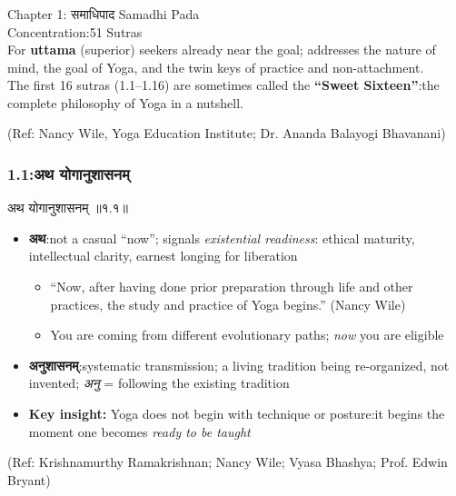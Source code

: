 \begin{frame}[fragile]\frametitle{}
\begin{center}
{\Large Chapter 1: समाधिपाद Samadhi Pada}\\
{\normalsize Concentration:51 Sutras}\\
{\small For \textbf{uttama} (superior) seekers already near the goal; addresses the nature of mind, the goal of Yoga, and the twin keys of practice and non-attachment.}\\
{\small The first 16 sutras (1.1–1.16) are sometimes called the \textbf{``Sweet Sixteen''}:the complete philosophy of Yoga in a nutshell.}
\end{center}
\tiny{(Ref: Nancy Wile, Yoga Education Institute; Dr. Ananda Balayogi Bhavanani)}
\end{frame}

\begin{frame}[fragile]\frametitle{1.1:अथ योगानुशासनम्}

\begin{sanskrit}
अथ योगानुशासनम् ॥१.१॥
\end{sanskrit}

\begin{itemize}
\item \textbf{अथ}:not a casual ``now''; signals \emph{existential readiness}: ethical maturity, intellectual clarity, earnest longing for liberation
    \begin{itemize}
    \item ``Now, after having done prior preparation through life and other practices, the study and practice of Yoga begins.'' (Nancy Wile)
    \item You are coming from different evolutionary paths; \emph{now} you are eligible
    \end{itemize}
\item \textbf{अनुशासनम्}:systematic transmission; a living tradition being re-organized, not invented; \emph{अनु} = following the existing tradition
\item \textbf{Key insight:} Yoga does not begin with technique or posture:it begins the moment one becomes \emph{ready to be taught}
\end{itemize}

\tiny{(Ref: Krishnamurthy Ramakrishnan; Nancy Wile; Vyasa Bhashya; Prof. Edwin Bryant)}

\end{frame}


